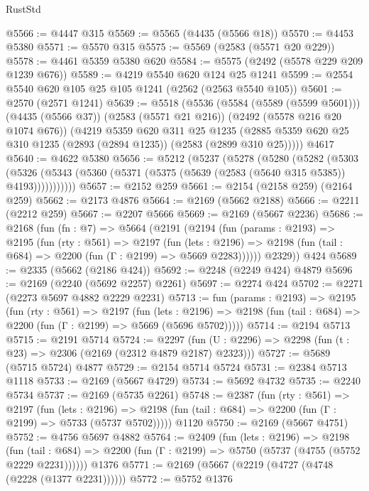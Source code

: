 \begin{lexlean}{RustStd}
\begin{coremodule}
{\begin{coremodule}
{{{{{{{{{{{{{{{@5566 := @4447 @315
@5569 := @5565 (@4435 (@5566 @18))
@5570 := @4453 @5380
@5571 := @5570 @315
@5575 := @5569 (@2583 (@5571 @20 @229))
@5578 := @4461 @5359 @5380 @620
@5584 := @5575 (@2492 (@5578 @229 @209 @1239 @676))
@5589 := @4219 @5540 @620 @124 @25 @1241
@5599 := @2554 @5540 @620 @105 @25 @105 @1241 (@2562 (@2563 @5540 @105))
@5601 := @2570 (@2571 @1241)
@5639 := @5518
    (@5536
      (@5584 (@5589 (@5599 @5601)))
      (@4435 (@5566 @37))
      (@2583 (@5571 @21 @216))
      (@2492 (@5578 @216 @20 @1074 @676))
      (@4219
        @5359
        @620
        @311
        @25
        @1235
        (@2885 @5359 @620 @25 @310 @1235 (@2893 (@2894 @1235)) (@2583 (@2899 @310 @25)))))
    @4617
@5640 := @4622 @5380
@5656 := @5212
    (@5237
      (@5278
        (@5280
          (@5282
            (@5303
              (@5326 (@5343 (@5360 (@5371 (@5375 (@5639 (@2583 (@5640 @315 @5385)) @4193)))))))))))
@5657 := @2152 @259
@5661 := @2154 (@2158 @259) (@2164 @259)
@5662 := @2173 @4876
@5664 := @2169 (@5662 @2188)
@5666 := @2211 (@2212 @259)
@5667 := @2207 @5666
@5669 := @2169 (@5667 @2236)
@5686 := @2168
    (fun (fn : @7) =>
    @5664
      (@2191
        (@2194
          (fun (params : @2193) =>
          @2195
            (fun (rty : @561) =>
            @2197
              (fun (lets : @2196) =>
              @2198 (fun (tail : @684) => @2200 (fun (Γ : @2199) => @5669 @2283))))))
        @2329))
    @424
@5689 := @2335 (@5662 (@2186 @424))
@5692 := @2248 (@2249 @424) @4879
@5696 := @2169 (@2240 (@5692 @2257) @2261)
@5697 := @2274 @424
@5702 := @2271 (@2273 @5697 @4882 @2229 @2231)
@5713 := fun (params : @2193) =>
  @2195
    (fun (rty : @561) =>
    @2197
      (fun (lets : @2196) =>
      @2198 (fun (tail : @684) => @2200 (fun (Γ : @2199) => @5669 (@5696 @5702)))))
@5714 := @2194 @5713
@5715 := @2191 @5714
@5724 := @2297 (fun (U : @2296) => @2298 (fun (t : @23) => @2306 (@2169 (@2312 @4879 @2187) @2323)))
@5727 := @5689 (@5715 @5724) @4877
@5729 := @2154 @5714 @5724
@5731 := @2384 @5713 @1118
@5733 := @2169 (@5667 @4729)
@5734 := @5692 @4732
@5735 := @2240 @5734
@5737 := @2169 (@5735 @2261)
@5748 := @2387
    (fun (rty : @561) =>
    @2197
      (fun (lets : @2196) =>
      @2198 (fun (tail : @684) => @2200 (fun (Γ : @2199) => @5733 (@5737 @5702)))))
    @1120
@5750 := @2169 (@5667 @4751)
@5752 := @4756 @5697 @4882
@5764 := @2409
    (fun (lets : @2196) =>
    @2198
      (fun (tail : @684) => @2200 (fun (Γ : @2199) => @5750 (@5737 (@4755 (@5752 @2229 @2231))))))
    @1376
@5771 := @2169 (@5667 (@2219 (@4727 (@4748 (@2228 (@1377 @2231))))))
@5772 := @5752 @1376
}}}}}}}}}}}}}}}
\end{coremodule}}
\end{coremodule}
\end{lexlean}
